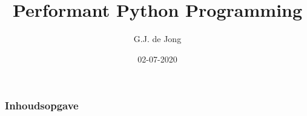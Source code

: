 \documentclass[aspectratio=169]{beamer}
\title{Performant Python Programming}
\author{G.J. de Jong}
\date{02-07-2020}
\begin{document}
\frame{\titlepage}

\begin{frame}
  \frametitle{Inhoudsopgave}
  \tableofcontents
\end{frame}
\end{document}
